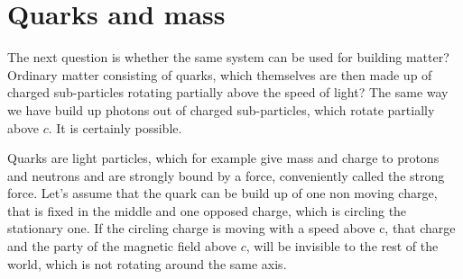 \chapter{Quarks and mass}

The next question is whether the same system can be used for building matter? Ordinary matter consisting of quarks, which themselves are then made up of charged sub-particles rotating partially above the speed of light? The same way we have build up photons out of charged sub-particles, which rotate partially above $c$.    It is certainly possible. 

Quarks are light particles, which for example give mass and charge to protons and neutrons and are strongly bound by a force, conveniently called the strong force. Let's assume that the quark can be build up of one non moving charge, that is fixed in the middle and one opposed charge, which is circling the stationary one. If the circling charge is moving with a speed above c, that charge and the party of the magnetic field above $c$, will be invisible to the rest of the world, which is not rotating around the same axis.

